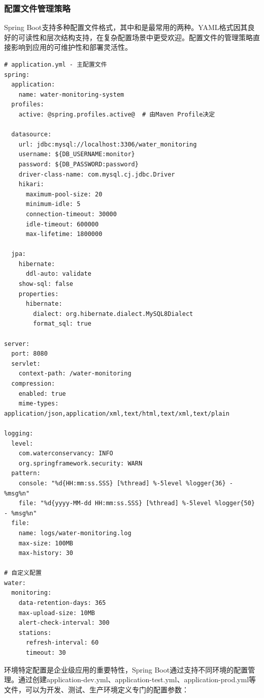 \hypertarget{ux914dux7f6eux6587ux4ef6ux7ba1ux7406ux7b56ux7565}{%
\subsubsection{配置文件管理策略}\label{ux914dux7f6eux6587ux4ef6ux7ba1ux7406ux7b56ux7565}}

Spring Boot支持多种配置文件格式，其中和是最常用的两种。YAML格式因其良好的可读性和层次结构支持，在复杂配置场景中更受欢迎。配置文件的管理策略直接影响到应用的可维护性和部署灵活性。

\begin{lstlisting}
# application.yml - 主配置文件
spring:
  application:
    name: water-monitoring-system
  profiles:
    active: @spring.profiles.active@  # 由Maven Profile决定
  
  datasource:
    url: jdbc:mysql://localhost:3306/water_monitoring
    username: ${DB_USERNAME:monitor}
    password: ${DB_PASSWORD:password}
    driver-class-name: com.mysql.cj.jdbc.Driver
    hikari:
      maximum-pool-size: 20
      minimum-idle: 5
      connection-timeout: 30000
      idle-timeout: 600000
      max-lifetime: 1800000

  jpa:
    hibernate:
      ddl-auto: validate
    show-sql: false
    properties:
      hibernate:
        dialect: org.hibernate.dialect.MySQL8Dialect
        format_sql: true

server:
  port: 8080
  servlet:
    context-path: /water-monitoring
  compression:
    enabled: true
    mime-types: application/json,application/xml,text/html,text/xml,text/plain

logging:
  level:
    com.waterconservancy: INFO
    org.springframework.security: WARN
  pattern:
    console: "%d{HH:mm:ss.SSS} [%thread] %-5level %logger{36} - %msg%n"
    file: "%d{yyyy-MM-dd HH:mm:ss.SSS} [%thread] %-5level %logger{50} - %msg%n"
  file:
    name: logs/water-monitoring.log
    max-size: 100MB
    max-history: 30

# 自定义配置
water:
  monitoring:
    data-retention-days: 365
    max-upload-size: 10MB
    alert-check-interval: 300
    stations:
      refresh-interval: 60
      timeout: 30
\end{lstlisting}

环境特定配置是企业级应用的重要特性，Spring Boot通过支持不同环境的配置管理。通过创建application-dev.yml、application-test.yml、application-prod.yml等文件，可以为开发、测试、生产环境定义专门的配置参数：

